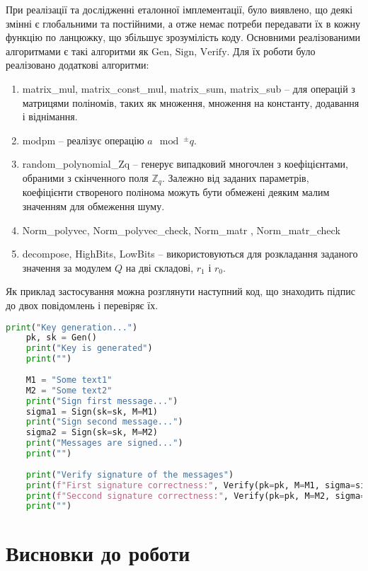 \documentclass[12pt]{HomusWorkus}
\begin{document}
При реалізації та дослідженні еталонної імплементації, було виявлено, що деякі змінні є глобальними та постійними, а отже немає потреби передавати їх в кожну функцію по ланцюжку, що збільшує зрозумілість коду. Основними реалізованими алгоритмами є такі алгоритми як $\mathrm{Gen}$, $\mathrm{Sign}$, $\mathrm{Verify}$. Для їх роботи було реалізовано додаткові алгоритми:
\begin{enumerate}
    \item matrix\_mul, matrix\_const\_mul, matrix\_sum, matrix\_sub -- для операцій з матрицями поліномів, таких як множення, множення на константу, додавання і віднімання.
    \item modpm -- реалізує операцію $a \mod^{\pm} q$.
    \item random\_polynomial\_Zq -- генерує випадковий многочлен з коефіцієнтами, обраними з скінченного поля $\mathbb{Z}_q$. Залежно від заданих параметрів, коефіцієнти створеного полінома можуть бути обмежені деяким малим значенням для обмеження шуму.
    \item Norm\_polyvec, Norm\_polyvec\_check, Norm\_matr ,  Norm\_matr\_check
    \item decompose, HighBits, LowBits -- використовуються для розкладання заданого значення за модулем $Q$ на дві складові, $r_1$ і $r_0$.
\end{enumerate}

Як приклад застосування можна розглянути наступний код, що знаходить підпис до двох повідомлень і перевіряє їх.

\begin{lstlisting}[language=Python]
    print("Key generation...")
    pk, sk = Gen()
    print("Key is generated")
    print("")
    
    M1 = "Some text1"
    M2 = "Some text2"
    print("Sign first message...")
    sigma1 = Sign(sk=sk, M=M1)
    print("Sign second message...")
    sigma2 = Sign(sk=sk, M=M2)
    print("Messages are signed...")
    print("")
    
    print("Verify signature of the messages")
    print(f"First signature correctness:", Verify(pk=pk, M=M1, sigma=sigma1))
    print(f"Seccond signature correctness:", Verify(pk=pk, M=M2, sigma=sigma2))
    print("")
\end{lstlisting}

\section{Висновки до роботи}
\end{document}
